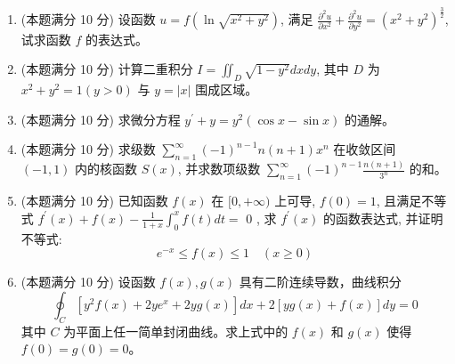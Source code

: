 \begin{enumerate}


\item 
(本题满分 10 分)
设函数 $u=f\left(\ln \sqrt{x^{2}+y^{2}}\right)$, 满足 $\frac{\partial^{2} u}{\partial x^{2}}+\frac{\partial^{2} u}{\partial y^{2}}=\left(x^{2}+y^{2}\right)^{\frac{3}{2}}$, 试求函数 $f$ 的表达式。




\newpage
\item 
(本题满分 10 分)
计算二重积分 $I=\iint_{D} \sqrt{1-y^{2}} d x d y$, 其中 $D$ 为 $x^{2}+y^{2}=1(y>0)$ 与 $y=|x|$ 围成区域。




\item 
(本题满分 10 分)
求微分方程 $y^{\prime}+y=y^{2}(\cos x-\sin x)$ 的通解。




\item 
(本题满分 10 分)
求级数 $\sum\limits_{n=1}^{\infty}(-1)^{n-1} n(n+1) x^{n}$ 在收敛区间 $(-1,1)$ 内的核函数 $S(x)$, 并求数项级数 $\sum\limits_{n=1}^{\infty}(-1)^{n-1} \frac{n(n+1)}{3^{n}}$ 的和。



\item 
(本题满分 10 分)
已知函数 $f(x)$ 在 $[0,+\infty)$ 上可导, $f(0)=1$, 且满足不等式 $f^{\prime}(x)+f(x)-\frac{1}{1+x} \int_{0}^{x} f(t) d t=$ 0 , 求 $f^{\prime}(x)$ 的函数表达式, 并证明不等式:
\[
e^{-x} \leqslant f(x) \leqslant 1 \quad(x \geqslant 0)
\]





\item 
(本题满分 10 分)
设函数 $f(x), g(x)$ 具有二阶连续导数，曲线积分
\[ 
\oint_{C}\left[y^{2} f(x)+2 y e^{x}+2 y g(x)\right] d x+2[y g(x)+f(x)] d y=0
 \]
其中 $C$ 为平面上任一简单封闭曲线。求上式中的 $f(x)$ 和 $g(x)$ 使得 $f(0)=g(0)=0$。



	
	
\end{enumerate}


